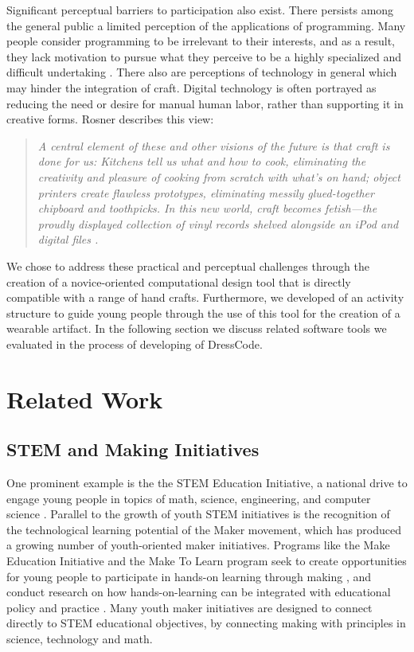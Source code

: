 \documentclass{sigchi}
\begin{document}
Significant perceptual barriers to participation also exist. There persists among the general public a limited perception of the applications of programming. Many people consider programming to be irrelevant to their interests, and as a result, they lack motivation to pursue what they perceive to be a highly specialized and difficult undertaking \cite{resnick1}. There also are perceptions of technology in general which may hinder the integration of craft. Digital technology is often portrayed as reducing the need or desire for manual human labor, rather than supporting it in creative forms. Rosner describes this view:

\begin{quotation}
 \textit{A central element of these and other visions of the future is that craft is done for us: Kitchens tell us what and how to cook, eliminating the creativity and pleasure of cooking from scratch with what's on hand; object printers create flawless prototypes, eliminating messily glued-together chipboard and toothpicks. In this new world, craft becomes fetish---the proudly displayed collection of vinyl records shelved alongside an iPod and digital files \cite{rosner_craft_vs_design}.}
\end{quotation}

We chose to address these practical and perceptual challenges through the creation of a novice-oriented computational design tool that is directly compatible with a range of hand crafts. Furthermore, we developed of an activity structure to guide young people through the use of this tool for the creation of a wearable artifact. In the following section we discuss related software tools we evaluated in the process of developing of DressCode.
\section{Related Work}
\subsection{STEM and Making Initiatives}
One prominent example is the the STEM Education Initiative, a national drive to engage young people in topics of math, science, engineering, and computer science \cite{stemReport}. Parallel to the growth of youth STEM initiatives is the recognition of the technological learning potential of the Maker movement, which has produced a growing number of youth-oriented maker initiatives. Programs like the Make Education Initiative and the Make To Learn program seek to create opportunities for young people to participate in hands-on learning through making \cite{makerinitiatives}, and conduct research on how hands-on-learning can be integrated with educational policy and practice \cite{maketolearn}. Many youth maker initiatives are designed to connect directly to STEM educational objectives, by connecting making with principles in science, technology and math.
\end{document}
